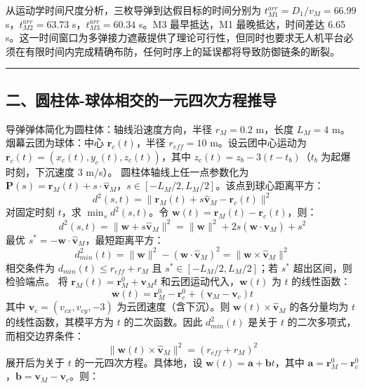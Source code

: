 \documentclass{JXUSTmodeling}
\begin{document}
从运动学时间尺度分析，三枚导弹到达假目标的时间分别为 $t_{M1}^{arr}=D_1/v_M=66.99$ s，$t_{M2}^{arr}=63.73$ s，$t_{M3}^{arr}=60.34$ s。M3 最早抵达，M1 最晚抵达，时间差达 6.65 s。这一时间窗口为多弹接力遮蔽提供了理论可行性，但同时也要求无人机平台必须在有限时间内完成精确布防，任何时序上的延误都将导致防御链条的断裂。
\noindent\rule{\textwidth}{0.4pt}
\subsection{二、圆柱体-球体相交的一元四次方程推导}
导弹弹体简化为圆柱体：轴线沿速度方向，半径 $r_M=0.2$ m，长度 $L_M=4$ m。烟幕云团为球体：中心 $\mathbf{r}_c(t)$，半径 $r_{eff}=10$ m。设云团中心运动为 $\mathbf{r}_c(t)=(x_c(t), y_c(t), z_c(t))$，其中 $z_c(t)=z_b-3(t-t_b)$（$t_b$ 为起爆时刻，下沉速度 3 m/s）。
圆柱体轴线上任一点参数化为 $\mathbf{P}(s)=\mathbf{r}_M(t)+s\cdot\hat{\mathbf{v}}_M$，$s\in[-L_M/2, L_M/2]$。该点到球心距离平方：
\begin{equation}
d^2(s,t)=\|\mathbf{r}_M(t)+s\hat{\mathbf{v}}_M-\mathbf{r}_c(t)\|^2 \tag{6}
\end{equation}
对固定时刻 $t$，求 $\min_s d^2(s,t)$。令 $\mathbf{w}(t)=\mathbf{r}_M(t)-\mathbf{r}_c(t)$，则：
\begin{equation}
d^2(s,t)=\|\mathbf{w}+s\hat{\mathbf{v}}_M\|^2=\|\mathbf{w}\|^2+2s(\mathbf{w}\cdot\hat{\mathbf{v}}_M)+s^2 \tag{7}
\end{equation}
最优 $s^*=-\mathbf{w}\cdot\hat{\mathbf{v}}_M$，最短距离平方：
\begin{equation}
d_{min}^2(t)=\|\mathbf{w}\|^2-(\mathbf{w}\cdot\hat{\mathbf{v}}_M)^2=\|\mathbf{w}\times\hat{\mathbf{v}}_M\|^2 \tag{8}
\end{equation}
相交条件为 $d_{min}(t)\leq r_{eff}+r_M$ 且 $s^*\in[-L_M/2, L_M/2]$；若 $s^*$ 超出区间，则检验端点。
将 $\mathbf{r}_M(t)=\mathbf{r}_M^0+\mathbf{v}_M t$ 和云团运动代入，$\mathbf{w}(t)$ 为 $t$ 的线性函数：
\begin{equation}
\mathbf{w}(t)=\mathbf{r}_M^0-\mathbf{r}_c^0+(\mathbf{v}_M-\mathbf{v}_c)t \tag{9}
\end{equation}
其中 $\mathbf{v}_c=(v_{cx}, v_{cy}, -3)$ 为云团速度（含下沉）。则 $\mathbf{w}(t)\times\hat{\mathbf{v}}_M$ 的各分量均为 $t$ 的线性函数，其模平方为 $t$ 的二次函数。因此 $d_{min}^2(t)$ 是关于 $t$ 的二次多项式，而相交边界条件：
\begin{equation}
\|\mathbf{w}(t)\times\hat{\mathbf{v}}_M\|^2=(r_{eff}+r_M)^2 \tag{10}
\end{equation}
展开后为关于 $t$ 的一元四次方程。具体地，设 $\mathbf{w}(t)=\mathbf{a}+\mathbf{b}t$，其中 $\mathbf{a}=\mathbf{r}_M^0-\mathbf{r}_c^0$，$\mathbf{b}=\mathbf{v}_M-\mathbf{v}_c$。则：
\end{document}
